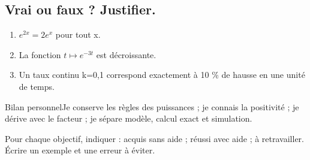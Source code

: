 \subsection*{Vrai ou faux ? Justifier.}\label{C09-VF}
\begin{enumerate}
\item $e^{2x}=2e^x$ pour tout x.
\item La fonction $t\mapsto e^{-3t}$ est décroissante.
\item Un taux continu k=0,1 correspond exactement à 10 \% de hausse en une unité de temps.
\end{enumerate}
\begin{repere}{Bilan personnel}Je conserve les règles des puissances ; je connais la positivité ; je dérive avec le facteur ; je sépare modèle, calcul exact et simulation.

Pour chaque objectif, indiquer : acquis sans aide ; réussi avec aide ; à retravailler. Écrire un exemple et une erreur à éviter.\end{repere}
\endgroup
\ifprof\fi
